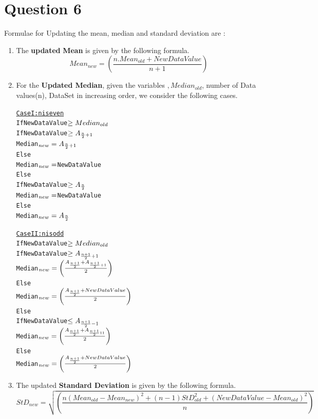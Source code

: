\documentclass[12pt]{article}
\begin{document}
\section{Question 6}
Formulae for Updating the mean, median and standard deviation are :
\begin{enumerate}
\item The \textbf{updated} \textbf{Mean} is given by the following formula.
$$
Mean_{new} = \left(\frac{n.Mean_{old} + NewDataValue}{n+1}\right)
$$

\item For the \textbf{Updated Median}, given the variables $, Median_{old}$, number of Data \newline values(n), DataSet in increasing order, we consider the following cases.
\begin{alltt}
{\large\underline{Case I : n is even}}
      If NewDataValue \(\geq Median\sb{old}\)
            If NewDataValue \(\geq A\sb{\frac{n}{2}+1}\)
                  Median\(\sb{new} = A\sb{\frac{n}{2}+1}\)
            Else
                  Median\(\sb{new} = \)NewDataValue
      Else
            If NewDataValue \(\geq A\sb{\frac{n}{2}}\)
                  Median\(\sb{new} = \)NewDataValue
            Else
                  Median\(\sb{new} = A\sb{\frac{n}{2}}\)

{\large\underline{Case II : n is odd}}
      If NewDataValue \(\geq Median\sb{old}\)
            If NewDataValue \(\geq A\sb{\frac{n+1}{2}+1}\)
                  Median\(\sb{new} = \left(\frac{A\sb{\frac{n+1}{2}}+A\sb{\frac{n+1}{2}+1}}{2}\right)\)
            Else
                  Median\(\sb{new} = \left(\frac{A\sb{\frac{n+1}{2}}+NewDataValue}{2}\right)\)
      Else
            If NewDataValue \(\leq A\sb{\frac{n+1}{2}-1}\)
                  Median\(\sb{new} = \left(\frac{A\sb{\frac{n+1}{2}}+A\sb{\frac{n+1}{2}11}}{2}\right)\)
            Else
                  Median\(\sb{new} = \left(\frac{A\sb{\frac{n+1}{2}}+NewDataValue}{2}\right)\)

\end{alltt}

\item The updated \textbf{Standard Deviation }is given by the following formula.
$$
StD_{new} = \sqrt{\left(\frac{n(Mean_{old}-Mean_{new})^2 + (n-1)StD_{old}^2 + (NewDataValue - Mean_{old})^2}{n}\right)}
$$

\end{enumerate}
\newpage
\end{document}

